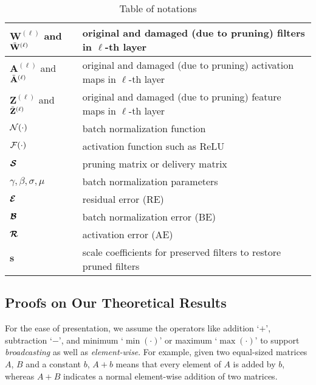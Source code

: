\begin{table}[h]
\centering
\begin{tabular}{l||l}
\hline
$\mathbf{W}^{(\ell)}$ and $\Tilde{\mathbf{W}}^{(\ell)}$                 &  original and damaged (due to pruning) filters in $\ell$-th layer            \\ \hline
$\mathbf{A}^{(\ell)}$ and $\Tilde{\mathbf{A}}^{(\ell)}$         & original and damaged (due to pruning) activation maps in $\ell$-th layer                                 \\ \hline
$\mathbf{Z}^{(\ell)}$  and $\Tilde{\mathbf{Z}}^{(\ell)}$         & original and damaged (due to pruning) feature maps in $\ell$-th layer                                    \\ \hline
$\N(\cdot)$                   & batch normalization function                                     \\ \hline
$\F(\cdot)$                   & activation function such as ReLU                                             \\ \hline
$\boldsymbol{\S}$                         & pruning matrix or delivery matrix                                        \\ \hline
$\gamma, \beta, \sigma, \mu$                    & batch normalization parameters              \\ \hline
$\boldsymbol{\E}$                         & residual error (RE)                                       \\ \hline
$\boldsymbol{\B}$                         & batch normalization error (BE)                              \\ \hline
$\boldsymbol{\R}$                         & activation error (AE)                              \\ \hline
$\mathbf{s}$                              & scale coefficients for preserved filters to restore pruned filters              \\ \hline
\end{tabular}%
\vspace{2mm}
\caption{Table of notations}
\label{tab:notations}
\end{table}


\subsection{Proofs on Our Theoretical Results} \label{sec:appendix:proof}
For the ease of presentation, we assume the operators like addition `$+$', subtraction `$-$', and minimum `$\min(\cdot)$' or maximum `$\max(\cdot)$' to support \textit{broadcasting} as well as \textit{element-wise}. For example, given two equal-sized matrices $A$, $B$ and a constant $b$, $A+b$ means that every element of $A$ is added by $b$, whereas $A+B$ indicates a normal element-wise addition of two matrices.

